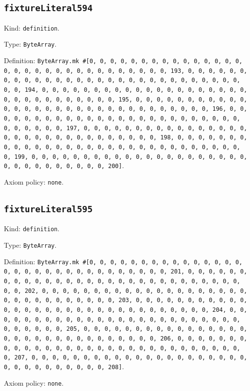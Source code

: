 \documentclass[11pt]{article}
\begin{document}
\subsection*{\texttt{fixtureLiteral594}}
\noindent Kind: \texttt{definition}.\par
\noindent Type: \texttt{ByteArray}.\par
\noindent Definition: \texttt{ByteArray.mk \#[0, 0, 0, 0, 0, 0, 0, 0, 0, 0, 0, 0, 0, 0, 0, 0, 0, 0, 0, 0, 0, 0, 0, 0, 0, 0, 0, 0, 0, 0, 0, 193, 0, 0, 0, 0, 0, 0, 0, 0, 0, 0, 0, 0, 0, 0, 0, 0, 0, 0, 0, 0, 0, 0, 0, 0, 0, 0, 0, 0, 0, 0, 0, 194, 0, 0, 0, 0, 0, 0, 0, 0, 0, 0, 0, 0, 0, 0, 0, 0, 0, 0, 0, 0, 0, 0, 0, 0, 0, 0, 0, 0, 0, 0, 0, 195, 0, 0, 0, 0, 0, 0, 0, 0, 0, 0, 0, 0, 0, 0, 0, 0, 0, 0, 0, 0, 0, 0, 0, 0, 0, 0, 0, 0, 0, 0, 0, 196, 0, 0, 0, 0, 0, 0, 0, 0, 0, 0, 0, 0, 0, 0, 0, 0, 0, 0, 0, 0, 0, 0, 0, 0, 0, 0, 0, 0, 0, 0, 0, 197, 0, 0, 0, 0, 0, 0, 0, 0, 0, 0, 0, 0, 0, 0, 0, 0, 0, 0, 0, 0, 0, 0, 0, 0, 0, 0, 0, 0, 0, 0, 0, 198, 0, 0, 0, 0, 0, 0, 0, 0, 0, 0, 0, 0, 0, 0, 0, 0, 0, 0, 0, 0, 0, 0, 0, 0, 0, 0, 0, 0, 0, 0, 0, 199, 0, 0, 0, 0, 0, 0, 0, 0, 0, 0, 0, 0, 0, 0, 0, 0, 0, 0, 0, 0, 0, 0, 0, 0, 0, 0, 0, 0, 0, 0, 0, 200]}.\par
\noindent Axiom policy: \texttt{none}.\par
\subsection*{\texttt{fixtureLiteral595}}
\noindent Kind: \texttt{definition}.\par
\noindent Type: \texttt{ByteArray}.\par
\noindent Definition: \texttt{ByteArray.mk \#[0, 0, 0, 0, 0, 0, 0, 0, 0, 0, 0, 0, 0, 0, 0, 0, 0, 0, 0, 0, 0, 0, 0, 0, 0, 0, 0, 0, 0, 0, 0, 201, 0, 0, 0, 0, 0, 0, 0, 0, 0, 0, 0, 0, 0, 0, 0, 0, 0, 0, 0, 0, 0, 0, 0, 0, 0, 0, 0, 0, 0, 0, 0, 202, 0, 0, 0, 0, 0, 0, 0, 0, 0, 0, 0, 0, 0, 0, 0, 0, 0, 0, 0, 0, 0, 0, 0, 0, 0, 0, 0, 0, 0, 0, 0, 203, 0, 0, 0, 0, 0, 0, 0, 0, 0, 0, 0, 0, 0, 0, 0, 0, 0, 0, 0, 0, 0, 0, 0, 0, 0, 0, 0, 0, 0, 0, 0, 204, 0, 0, 0, 0, 0, 0, 0, 0, 0, 0, 0, 0, 0, 0, 0, 0, 0, 0, 0, 0, 0, 0, 0, 0, 0, 0, 0, 0, 0, 0, 0, 205, 0, 0, 0, 0, 0, 0, 0, 0, 0, 0, 0, 0, 0, 0, 0, 0, 0, 0, 0, 0, 0, 0, 0, 0, 0, 0, 0, 0, 0, 0, 0, 206, 0, 0, 0, 0, 0, 0, 0, 0, 0, 0, 0, 0, 0, 0, 0, 0, 0, 0, 0, 0, 0, 0, 0, 0, 0, 0, 0, 0, 0, 0, 0, 207, 0, 0, 0, 0, 0, 0, 0, 0, 0, 0, 0, 0, 0, 0, 0, 0, 0, 0, 0, 0, 0, 0, 0, 0, 0, 0, 0, 0, 0, 0, 0, 208]}.\par
\noindent Axiom policy: \texttt{none}.\par
\end{document}
